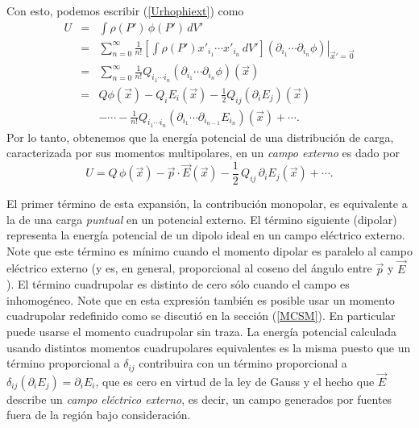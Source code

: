 Con esto, podemos escribir (\ref{Urhophiext}) como
\begin{eqnarray}
 U&=&\int\rho(P')\,\phi(P')\,dV'\\
&=&\sum_{n=0}^\infty\frac{1}{n!}\left[\int\rho(P')x'_{i_1}\cdots
x'_{i_n}\,dV'\right]\left.(\partial_{i_1}\cdots\partial_{i_n}\phi)\right|_{\vec{x}'=\vec{0}}\\
&=&\sum_{n=0}^\infty\frac{1}{n!}Q_{i_1\cdots i_n}(\partial_{i_1}\cdots\partial_{i_n}\phi)(\vec{x})\\
&=&Q\phi(\vec{x})-Q_iE_i(\vec{x})-\frac{1}{2}
Q_{ij}(\partial_iE_j)(\vec{x}) \nonumber \\
&& -\cdots-\frac{1}{n!}Q_{i_1\cdots i_n}(\partial_{i_1}
\cdots\partial_{i_{n-1}}E_{i_n})(\vec{x})+\cdots .
\end{eqnarray}
Por lo tanto, obtenemos que la energía potencial de una distribución de
carga, caracterizada por sus momentos multipolares, en un \textit{campo externo}
es dado por
\begin{equation} \label{eq3.3.4}
\boxed{U=Q\,\phi(\vec{x})-\vec{p}\cdot\vec{E}(\vec{x})-\frac{1}{2}\,Q_{ij}
\,\partial_iE_j(\vec{x})+\cdots .}
\end{equation}

El primer término de esta expansión, la contribución monopolar, es
equivalente a la de una carga \textit{puntual} en un potencial externo. El
término siguiente (dipolar) representa la energía potencial de un dipolo
ideal en un campo eléctrico externo. Note que este término es mínimo cuando
el momento dipolar es paralelo al campo eléctrico externo (y es, en general,
proporcional al coseno del ángulo entre $\vec{p}$ y $\vec{E}$). El término
cuadrupolar es distinto de cero sólo cuando el campo es inhomogéneo. Note que
en esta expresión también es posible usar un momento cuadrupolar redefinido
como se discutió en la sección (\ref{MCSM}). En particular puede usarse el
momento cuadrupolar sin traza. La energía potencial calculada usando distintos
momentos cuadrupolares equivalentes es la misma puesto que un término
proporcional a $\delta_{ij}$ contribuira con un término proporcional a
$\delta_{ij}(\partial_iE_j)=\partial_iE_i$, que es cero en virtud de la ley de
Gauss y el hecho que $\vec{E}$ describe un \textit{campo eléctrico externo},
es decir, un campo generados por fuentes fuera de la región bajo
consideración.


